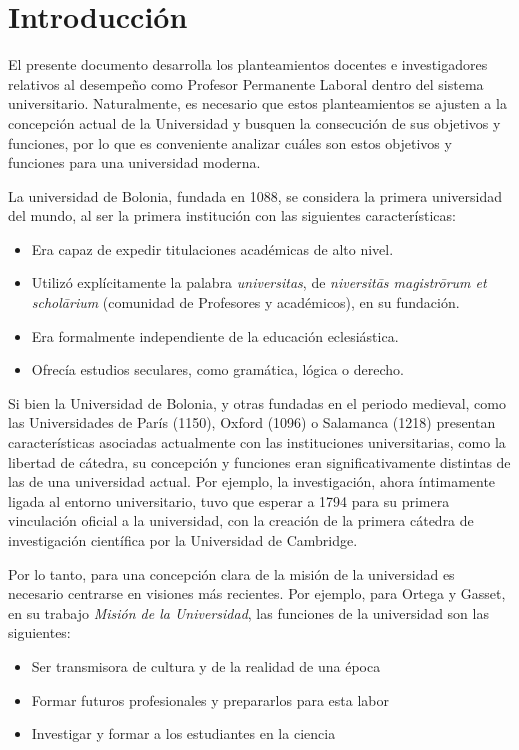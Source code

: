 \documentclass[a4paper,12pt,twoside]{article}
\begin{document}
\section{Introducci\'on}
\label{intro}

El presente documento desarrolla los planteamientos docentes e investigadores relativos al desempeño como Profesor Permanente Laboral dentro del sistema universitario. Naturalmente, es necesario que estos planteamientos se ajusten a la concepción actual de la Universidad y busquen la consecución de sus objetivos y funciones, por lo que es conveniente analizar cuáles son estos objetivos y funciones para una universidad moderna.

La universidad de Bolonia, fundada en 1088, se considera la primera universidad del mundo, al ser la primera institución con las siguientes características:

\begin{itemize}
\item Era capaz de expedir titulaciones académicas de alto nivel.
\item Utilizó explícitamente la palabra \textit{universitas}, de \textit{niversitās magistrōrum et scholārium} (comunidad de Profesores y académicos), en su fundación.
\item Era formalmente independiente de la educación eclesiástica.
\item Ofrecía estudios seculares, como gramática, lógica o derecho.
\end{itemize}

Si bien la Universidad de Bolonia, y otras fundadas en el periodo medieval, como las Universidades de París (1150), Oxford (1096) o Salamanca (1218) presentan características asociadas actualmente con las instituciones universitarias, como la libertad de cátedra, su concepción y funciones eran significativamente distintas de las de una universidad actual. Por ejemplo, la investigación, ahora íntimamente ligada al entorno universitario, tuvo que esperar a 1794 para su primera vinculación oficial a la universidad, con la creación de la primera cátedra de investigación científica por la Universidad de Cambridge.

Por lo tanto, para una concepción clara de la misión de la universidad es necesario centrarse en visiones más recientes. Por ejemplo, para Ortega y Gasset, en su trabajo \textit{Misión de la Universidad}\cite{ortega_gasset}, las funciones de la universidad son las siguientes:

\begin{itemize}
\item Ser transmisora de cultura y de la realidad de una época
\item Formar futuros profesionales y prepararlos para esta labor
\item Investigar y formar a los estudiantes en la ciencia
\end{itemize}
\end{document}
